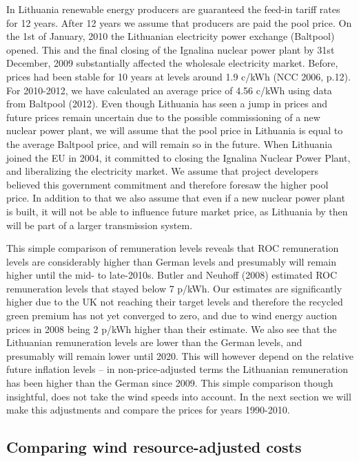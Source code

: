 \documentclass[a4paper, 12pt]{article}
\begin{document}
In Lithuania renewable energy producers are guaranteed the feed-in tariff rates for 12 years. After 12 years we assume that producers are paid the pool price. On the 1st of January, 2010 the Lithuanian electricity power exchange (Baltpool) opened. This and the final closing of the Ignalina nuclear power plant by 31st December, 2009 substantially affected the wholesale electricity market. Before, prices had been stable for 10 years at levels around 1.9 c/kWh (NCC 2006, p.12). For 2010-2012, we have calculated an average price of 4.56 c/kWh using data from Baltpool (2012). Even though Lithuania has seen a jump in prices and future prices remain uncertain due to the possible commissioning of a new nuclear power plant, we will assume that the pool price in Lithuania is equal to the average Baltpool price, and will remain so in the future. When Lithuania joined the EU in 2004, it committed to closing the Ignalina Nuclear Power Plant, and liberalizing the electricity market. We assume that project developers believed this government commitment and therefore foresaw the higher pool price. In addition to that we also assume that even if a new nuclear power plant is built, it will not be able to influence future market price, as Lithuania by then will be part of a larger transmission system.

This simple comparison of remuneration levels reveals that ROC remuneration levels are considerably higher than German levels and presumably will remain higher until the mid- to late-2010s. Butler and Neuhoff (2008) estimated ROC remuneration levels that stayed below 7 p/kWh. Our estimates are significantly higher due to the UK not reaching their target levels and therefore the recycled green premium has not yet converged to zero, and due to wind energy auction prices in 2008 being 2 p/kWh higher than their estimate. We also see that the Lithuanian remuneration levels are lower than the German levels, and presumably will remain lower until 2020. This will however depend on the relative future inflation levels – in non-price-adjusted terms the Lithuanian remuneration has been higher than the German since 2009. This simple comparison though insightful, does not take the wind speeds into account. In the next section we will make this adjustments and compare the prices for years 1990-2010.

\subsection{Comparing wind resource-adjusted costs}
\end{document}
